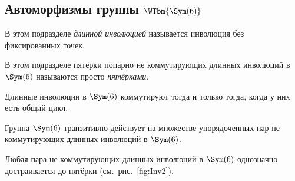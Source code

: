 \documentclass[
	extrafontsizes,
	11pt,
	hyphens,
]{memoir}
\begin{document}
\subsection{Автоморфизмы группы \texorpdfstring{\(\WTbm{\Sym(6)}\)}{\textbackslash{}Sym(6)}}

\begin{convention}
В этом подразделе \emph{длинной инволюцией} называется инволюция без фиксированных точек.
\end{convention}

\begin{convention}
В этом подразделе пятёрки попарно не коммутирующих длинных инволюций в \(\Sym(6)\) называются просто \emph{пятёрками}.
\end{convention}

\begin{observation} \label{obs:S6Inv1}
Длинные инволюции в \(\Sym(6)\) коммутируют тогда и только тогда, когда у них есть общий цикл.
\end{observation}

\begin{observation} \label{obs:S6Inv2}
Группа \(\Sym(6)\) транзитивно действует на множестве упорядоченных пар не коммутирующих длинных инволюций в \(\Sym(6)\).
\end{observation}

\begin{observation} \label{obs:S6Inv3}
Любая пара не коммутирующих длинных инволюций в \(\Sym(6)\) однозначно достраивается до пятёрки (см.\ рис.\ \ref{fig:Inv2}).
\end{observation}
\end{document}
